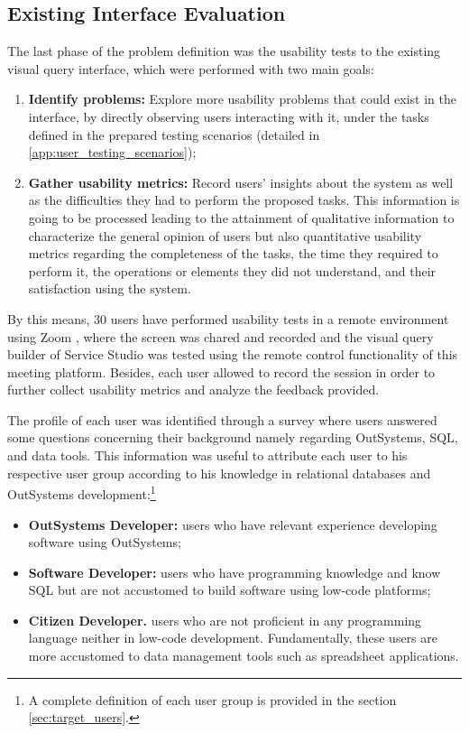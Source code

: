\subsection{Existing Interface Evaluation}
\label{sec:existing_interface_evaluation}
The last phase of the problem definition was the usability tests to the existing visual query interface, which were performed with two main goals:

\begin{enumerate}
    \item \textbf{Identify problems:} Explore more usability problems that could exist in the interface, by directly observing users interacting with it, under the tasks defined in the prepared testing scenarios (detailed in \ref{app:user_testing_scenarios});
    \item \textbf{Gather usability metrics:} Record users' insights about the system as well as the difficulties they had to perform the proposed tasks. This information is going to be processed leading to the attainment of qualitative information to characterize the general opinion of users but also quantitative usability metrics regarding the completeness of the tasks, the time they required to perform it, the operations or elements they did not understand, and their satisfaction using the system.
\end{enumerate}

By this means, 30 users have performed usability tests in a remote environment using Zoom \cite{zoom}, where the screen was chared and recorded and the visual query builder of Service Studio was tested using the remote control functionality of this meeting platform. Besides, each user allowed to record the session in order to further collect usability metrics and analyze the feedback provided.

The profile of each user was identified through a survey where users answered some questions concerning their background namely regarding OutSystems, \gls{SQL}, and data tools. This information was useful to attribute each user to his respective user group according to his knowledge in relational databases and OutSystems development:\footnote{A complete definition of each user group is provided in the section \ref{sec:target_users}.}

\begin{itemize}
    \item \textbf{OutSystems Developer: }users who have relevant experience developing software using OutSystems;
    \item \textbf{Software Developer: }users who have programming knowledge and know \gls{SQL} but are not accustomed to build software using low-code platforms;
    \item \textbf{Citizen Developer. }users who are not proficient in any programming language neither in low-code development. Fundamentally, these users are more accustomed to data management tools such as spreadsheet applications.
\end{itemize}


